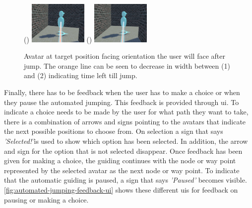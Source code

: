 \begin{figure}[]
	\centering
	() {\includegraphics[width=0.25\textwidth]{images/automated-jumping-feedback-1.pdf}}
	() {\includegraphics[width=0.25\textwidth]{images/automated-jumping-feedback-2.pdf}} 
	\caption{Avatar at target position facing orientation the user will face after jump. The orange line can be seen to decrease in width between (1) and (2) indicating time left till jump.}
	\label{fig:automated-jumping-feedback}
\end{figure}  

Finally, there has to be feedback  when the user has to make a choice or when they pause the automated jumping. This feedback is provided through \acrfull{ui}. To indicate a choice needs to be made by the user for what path they want to take, there is a combination of arrows and signs pointing to the avatars that indicate the next possible positions to choose from. On selection a sign that says \textit{'Selected!'}is used to show which option has been selected. In addition, the arrow and sign for the option that is not selected disappear. Once feedback has been given for making a choice, the guiding continues with the node or way point represented by the selected avatar as the next node or way point. To indicate that the automatic guiding is paused, a sign that says \textit{'Paused'} becomes visible. \cref{fig:automated-jumping-feedback-ui} shows these different \acrshort{ui}s for feedback on pausing or making a choice. 

